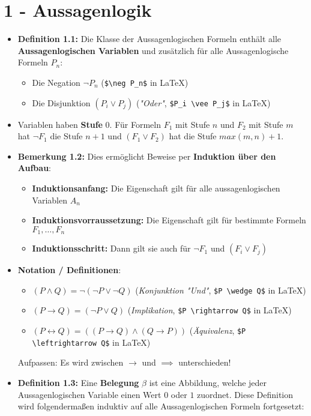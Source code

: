 \documentclass{scrartcl}
\begin{document}
\section*{1 - Aussagenlogik}
\begin{itemize}
    \item \textbf{Definition 1.1:} Die Klasse der Aussagenlogischen Formeln enthält alle \textbf{Aussagenlogischen Variablen} und zusätzlich für alle Aussagenlogische Formeln $P_n$:
    \begin{itemize}
        \item Die Negation $\neg P_n$ (\texttt{\$\textbackslash neg P\_n\$} in LaTeX)
        \item Die Disjunktion $(P_i \vee P_j)$ (\textit{"Oder"}, \texttt{\$P\_i \textbackslash vee P\_j\$} in LaTeX)
    \end{itemize}
    \item Variablen haben \textbf{Stufe} 0. Für Formeln $F_1$ mit Stufe $n$ und $F_2$ mit Stufe $m$ hat $\neg F_1$ die Stufe $n + 1$ und $(F_1 \vee F_2)$ hat die Stufe $max(m,n)+1$.
    \item \textbf{Bemerkung 1.2:} Dies ermöglicht Beweise per \textbf{Induktion über den Aufbau}:
    \begin{itemize}
        \item \textbf{Induktionsanfang:} Die Eigenschaft gilt für alle aussagenlogischen Variablen $A_n$
        \item \textbf{Induktionsvorraussetzung:} Die Eigenschaft gilt für bestimmte Formeln $F_1, \hdots, F_n$
        \item \textbf{Induktionsschritt:} Dann gilt sie auch für $\neg F_1$ und $(F_i \vee F_j)$
    \end{itemize}
    \item \textbf{Notation / Definitionen}:
    \begin{itemize}
        \item $(P \wedge Q) = \neg(\neg P \vee \neg Q)$ (\textit{Konjunktion "Und"}, \texttt{\$P \textbackslash wedge Q\$} in LaTeX)
        \item $(P \rightarrow Q) = (\neg P \vee Q)$ (\textit{Implikation}, \texttt{\$P \textbackslash rightarrow Q\$} in LaTeX)
        \item $(P \leftrightarrow Q) = ((P \to Q) \wedge (Q \to P))$ (\textit{Äquivalenz}, \texttt{\$P \textbackslash leftrightarrow Q\$} in LaTeX)
    \end{itemize}
    Aufpassen: Es wird zwischen $\longrightarrow$ und $\implies$ unterschieden!
    \item \textbf{Definition 1.3:} Eine \textbf{Belegung} $\beta$ ist eine Abbildung, welche jeder Aussagenlogischen Variable einen Wert $0$ oder $1$ zuordnet. Diese Definition wird folgendermaßen induktiv auf alle Aussagenlogischen Formeln fortgesetzt:

\end{itemize}
\end{document}
